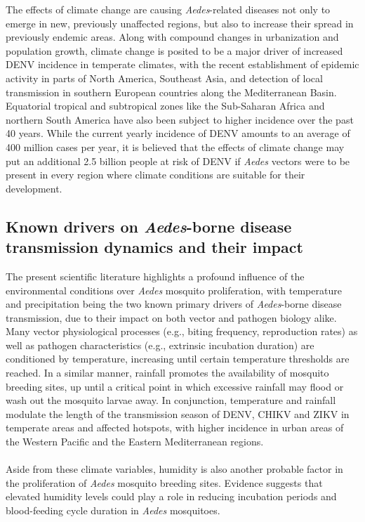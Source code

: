 \documentclass[10pt,twocolumn]{wlscirep}
\begin{document}
The effects of climate change are causing \textit{Aedes}-related diseases not only to emerge in new, previously unaffected regions, but also to increase their spread in previously endemic areas\cite{quam_2015}. Along with compound changes in urbanization\cite{lee_2021a} and population growth\cite{struchiner_2015}, climate change is posited to be a major driver of increased DENV incidence in temperate climates\cite{kraemer_2015}, with the recent establishment of epidemic activity in parts of North America\cite{franklinos_2019}, Southeast Asia\cite{ooi_2009}, and detection of local transmission in southern European countries along the Mediterranean Basin\cite{ECDC_2024}. Equatorial tropical and subtropical zones like the Sub-Saharan Africa and northern South America have also been subject to higher incidence over the past 40 years\cite{nakase_2024}. While the current yearly incidence of DENV amounts to an average of 400 million cases per year\cite{pourzangiabadi_2025}, it is believed that the effects of climate change may put an additional 2.5 billion people at risk of DENV if \textit{Aedes} vectors were to be present in every region where climate conditions are suitable for their development\cite{nakase_2024}.


\subsection{Known drivers on \textit{Aedes}-borne disease transmission dynamics and their impact} \label{sec-background-aedes-borne-diseases}

The present scientific literature highlights a profound influence of the environmental conditions over \textit{Aedes} mosquito proliferation, with temperature and precipitation being the two known primary drivers of \textit{Aedes}-borne disease transmission, due to their impact on both vector and pathogen biology alike. Many vector physiological processes (e.g., biting frequency, reproduction rates) as well as pathogen characteristics (e.g., extrinsic incubation duration) are conditioned by temperature, increasing until certain temperature thresholds are reached\cite{mordecai_2019}. In a similar manner, rainfall promotes the availability of mosquito breeding sites, up until a critical point in which excessive rainfall may flood or wash out the mosquito larvae away\cite{paaijmans_2007}. In conjunction, temperature and rainfall modulate the length of the transmission season of DENV, CHIKV and ZIKV in temperate areas and affected hotspots, with higher incidence in urban areas of the Western Pacific and the Eastern Mediterranean regions\cite{colon-gonzalez_2021}.
\\
\\
Aside from these climate variables, humidity is also another probable factor in the proliferation of \textit{Aedes} mosquito breeding sites. Evidence suggests that elevated humidity levels could play a role in reducing incubation periods and blood-feeding cycle duration in \textit{Aedes} mosquitoes\cite{descloux_2012}.
\end{document}
